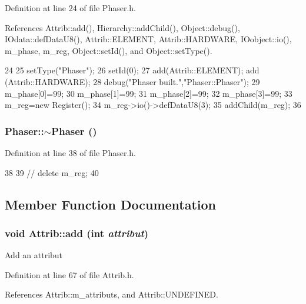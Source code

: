 Definition at line 24 of file Phaser.h.

References Attrib::add(), Hierarchy::addChild(), Object::debug(), IOdata::defDataU8(), Attrib::ELEMENT, Attrib::HARDWARE, IOobject::io(), m\_\-phase, m\_\-reg, Object::setId(), and Object::setType().


\begin{DoxyCode}
24           {
25     setType("Phaser");
26     setId(0);
27     add(Attrib::ELEMENT); add (Attrib::HARDWARE);
28     debug("Phaser built.","Phaser::Phaser");
29     m_phase[0]=99;
30     m_phase[1]=99;
31     m_phase[2]=99;
32     m_phase[3]=99;
33     m_reg=new Register();
34     m_reg->io()->defDataU8(3);
35     addChild(m_reg);
36   }
\end{DoxyCode}
\hypertarget{classPhaser_a1facd3a2776130beb38792025fd8be20}{
\subsubsection[{$\sim$Phaser}]{\setlength{\rightskip}{0pt plus 5cm}Phaser::$\sim$Phaser ()}}
\label{classPhaser_a1facd3a2776130beb38792025fd8be20}


Definition at line 38 of file Phaser.h.


\begin{DoxyCode}
38            {
39 //    delete m_reg;
40   }
\end{DoxyCode}


\subsection{Member Function Documentation}
\hypertarget{classAttrib_a235f773af19c900264a190b00a3b4ad7}{
\subsubsection[{add}]{\setlength{\rightskip}{0pt plus 5cm}void Attrib::add (int {\em attribut})}}
\label{classAttrib_a235f773af19c900264a190b00a3b4ad7}
Add an attribut 

Definition at line 67 of file Attrib.h.

References Attrib::m\_\-attributs, and Attrib::UNDEFINED.

